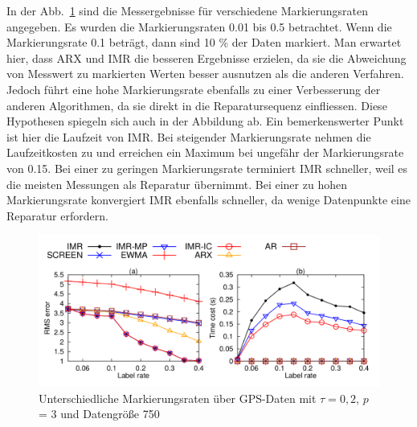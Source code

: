 In der Abb.~\ref{varying_labeling_rate} sind die Messergebnisse für
verschiedene Markierungsraten angegeben. Es wurden die Markierungsraten 0.01
bis 0.5 betrachtet. Wenn die Markierungsrate 0.1 beträgt, dann sind 10 \% der
Daten markiert. Man erwartet hier, dass ARX und IMR die besseren Ergebnisse
erzielen, da sie die Abweichung von Messwert zu markierten Werten besser
ausnutzen als die anderen Verfahren. Jedoch führt eine hohe Markierungsrate
ebenfalls zu einer Verbesserung der anderen Algorithmen, da sie direkt in die
Reparatursequenz einfliessen. Diese Hypothesen spiegeln sich auch in der
Abbildung ab. Ein bemerkenswerter Punkt ist hier die Laufzeit von IMR. Bei
steigender Markierungsrate nehmen die Laufzeitkosten zu und erreichen ein
Maximum bei ungefähr der Markierungsrate von 0.15. Bei einer zu geringen
Markierungsrate terminiert IMR schneller, weil es die meisten Messungen als
Reparatur übernimmt. Bei einer zu hohen Markierungsrate konvergiert IMR
ebenfalls schneller, da wenige Datenpunkte eine Reparatur erfordern. 

\begin{figure}[htbp]
    \centering
    \includegraphics[width=\textwidth]{../plots/varying_labeling_rate.png}
    \caption{Unterschiedliche Markierungsraten über GPS-Daten mit $\tau = 0,2$, $p$ = 3 und Datengröße 750}%
   \label{varying_labeling_rate}
\end{figure}
